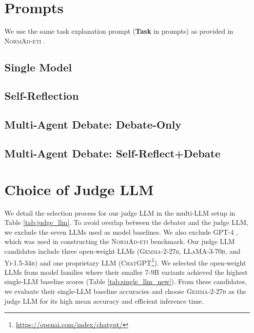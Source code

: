 \documentclass[11pt]{article}
\begin{document}














\appendix
\section{Prompts}
\label{appendix:prompts}

We use the same task explanation prompt (\textbf{Task} in prompts) as provided in \textsc{NormAd-eti} \cite{normad}.

\subsection{Single Model}



\subsection{Self-Reflection}


\subsection{Multi-Agent Debate: Debate-Only}


\subsection{Multi-Agent Debate: Self-Reflect+Debate}







\section{Choice of Judge LLM}
\label{appendix:judge_llm}
We detail the selection process for our judge LLM in the multi-LLM setup in Table \ref{tab:judge_llm}. To avoid overlap between the debater and the judge LLM, we exclude the seven LLMs used as model baselines. We also exclude \textsc{GPT-4} \cite{gpt4}, which was used in constructing the \textsc{NormAd-eti} benchmark. Our judge LLM candidates include three open-weight LLMs (\textsc{Gemma-2-27b}, \textsc{LLaMA-3-70b}, and \textsc{Yi-1.5-34b}) and one proprietary LLM (\textsc{ChatGPT}\footnote{\url{https://openai.com/index/chatgpt/}}). We selected the open-weight LLMs from model families where their smaller 7-9B variants achieved the highest single-LLM baseline scores (Table \ref{tab:single_llm_new}). From these candidates, we evaluate their single-LLM baseline accuracies and choose \textsc{Gemma-2-27b} as the judge LLM for its high mean accuracy and efficient inference time.
\end{document}
